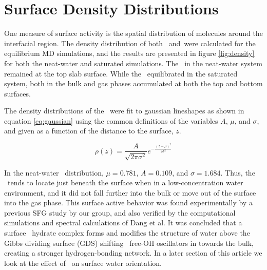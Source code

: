 \section{Surface Density Distributions}

One measure of surface activity is the spatial distribution of molecules around the interfacial region. The density distribution of both \wat~and\suldiox~were calculated for the equilibrium MD simulations, and the results are presented in figure \ref{fig:density} for both the neat-water and saturated simulations. The \suldiox~in the neat-water system remained at the top slab surface. While the \suldiox~equilibrated in the saturated system, both in the bulk and gas phases accumulated at both the top and bottom surfaces. 

The density distributions of the \suldiox~were fit to gaussian lineshapes as shown in equation \ref{eq:gaussian} using the common definitions of the variables $A$, $\mu$, and $\sigma$, and given as a function of the distance to the surface, $z$.

\begin{equation}
  \rho(z)=\frac{A}{\sqrt{2 \pi \sigma^2}} e^{-\frac{(z-\mu)^2}{2\sigma^2}}
  \label{eq:gaussian}
\end{equation}

In the neat-water \suldiox~distribution, $\mu=0.781$, $A=0.109$, and $\sigma=1.684$\angs. Thus, the \suldiox~tends to locate just beneath the surface when in a low-concentration water environment, and it did not fall further into the bulk or move out of the surface into the gas phase. This surface active behavior was found experimentally by a previous SFG study by our group,\cite{Tarbuck2005,Tarbuck2006} and also verified by the computational simulations and spectral calculations of Dang et al.\cite{Baer2010} It was concluded that a surface \suldiox~hydrate complex forms and modifies the structure of water above the Gibbs dividing surface (GDS) shifting \wat~free-OH oscillators in towards the bulk, creating a stronger hydrogen-bonding network. In a later section of this article we look at the effect of \suldiox~on surface water orientation.

